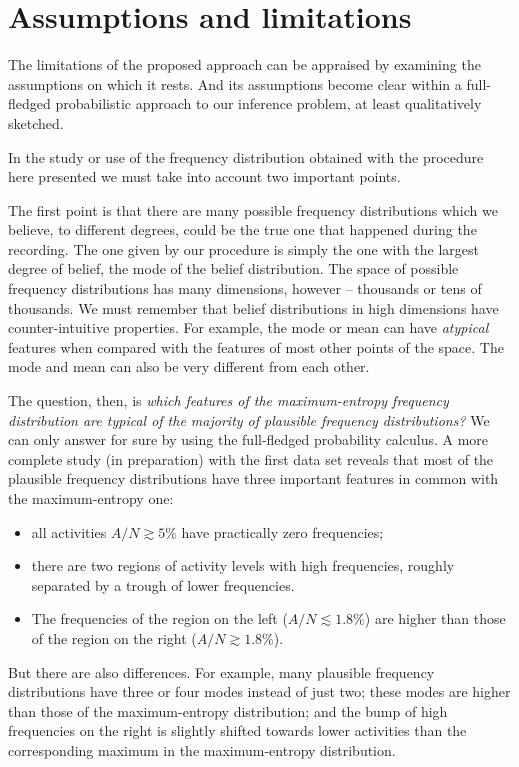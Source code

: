 \documentclass[\ifafour a4paper,12pt,\else a5paper,10pt,\fi%
onecolumn,oneside,article,%
british%
]{memoir}
\theoremstyle{remark}
\theoremstyle{innote}
\renewcommand*{\|}{\nonscript\,\vert\nonscript\;\mathopen{}}
\newcommand*{\yAv}{A}
\newcommand*{\yA}{\yAv}%
\begin{document}
\section{Assumptions and limitations}
\label{sec:assumptions}

The limitations of the proposed approach can be appraised by examining the
assumptions on which it rests. And its assumptions become clear within a
full-fledged probabilistic approach to our inference problem, at least
qualitatively sketched.





In the study or use of the frequency distribution obtained with the
procedure here presented we must take into account two important points.

The first point is that there are many possible frequency distributions
which we believe, to different degrees, could be the true one that happened
during the recording. The one given by our procedure is simply the one with
the largest degree of belief, the mode of the belief distribution. The
space of possible frequency distributions has many dimensions, however --
thousands or tens of thousands. We must remember that belief distributions
in high dimensions have counter-intuitive properties. For example, the mode
or mean can have \emph{atypical} features when compared with the features
of most other points of the space. The mode and mean can also be very
different from each other.

The question, then, is \emph{which features of the maximum-entropy
  frequency distribution are typical of the majority of plausible frequency
  distributions?} We can only answer for sure by using the full-fledged
probability calculus. A more complete study (in preparation) with the first
data set reveals that most of the plausible frequency distributions have
three important features in common with the maximum-entropy one:
\begin{itemize}
\item all activities $\yA/N \gtrsim 5\%$ have practically zero frequencies;
\item there are two regions of activity levels with high frequencies,
  roughly separated by a trough of lower frequencies.
\item The frequencies of the region on the left ($\yA/N \lesssim 1.8\%$)
  are higher than those of the region on the right ($\yA/N \gtrsim 1.8\%$).
\end{itemize}
But there are also differences. For example, many plausible frequency
distributions have three or four modes instead of just two; these modes are
higher than those of the maximum-entropy distribution; and the bump of high
frequencies on the right is slightly shifted towards lower activities than
the corresponding maximum in the maximum-entropy distribution.
\end{document}
